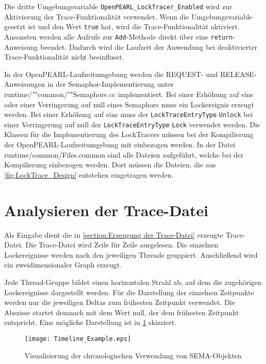 Die dritte Umgebungsvariable \texttt{OpenPEARL\_LockTracer\_Enabled} wird zur
Aktivierung der Trace-Funktionalität verwendet. Wenn die Umgebungsvariable
gesetzt ist und den Wert \texttt{true} hat, wird die Trace-Funktionalität
aktiviert. Ansonsten werden alle Aufrufe zur \texttt{Add}-Methode direkt über
eine \texttt{return}-Anweisung beendet. Dadurch wird die Laufzeit der Anwendung
bei deaktivierter Trace-Funktionalität nicht beeinflusst.

In der OpenPEARL-Laufzeitumgebung werden die \textrm{REQUEST}- und
\textrm{RELEASE}-Anweisungen in der Semaphor-Implementierung unter
runtime/""common/""Semaphore.cc implementiert. Bei einer Erhöhung auf eins oder
einer Verringerung auf null eines Semaphors muss ein Lockereignis erzeugt
werden. Bei einer Erhöhung auf eins muss der \texttt{Lock\-Trace\-Entry\-Type}
\texttt{Unlock} bei einer Verringerung auf null der
\texttt{Lock\-Trace\-Entry\-Type} \texttt{Lock} verwendet werden. Die Klassen
für die Implementierung des LockTracers müssen bei der Kompilierung der
OpenPEARL-Laufzeitumgebung mit einbezogen werden. In der Datei
runtime/common/Files.common sind alle Dateien aufgeführt, welche bei der
Kompilierung einbezogen werden. Dort müssen die Dateien, die aus
\cref{fig:LockTrace_Design} entstehen eingetragen werden.

\section{Analysieren der Trace-Datei}
\label{section:Analysieren der Trace-Datei}
Als Eingabe dient die in \cref{section:Erzeugung der Trace-Datei} erzeugte
Trace-Datei. Die Trace-Datei wird Zeile für Zeile ausgelesen. Die einzelnen
Lockereignisse werden nach den jeweiligen Threads gruppiert. Anschließend wird
ein zweidimensionaler Graph erzeugt.

Jede Thread-Gruppe bildet einen horizontalen Strahl ab, auf dem die zugehörigen
Lockereignisse dargestellt werden. Für die Darstellung der einzelnen Zeitpunkte
werden nur die jeweiligen Deltas zum frühesten Zeitpunkt verwendet. Die Abszisse
startet demnach mit dem Wert null, der dem frühesten Zeitpunkt entspricht. Eine
mögliche Darstellung ist in \cref{fig:Timeline_Example} skizziert.
\begin{figure}[ht]
  \texttt{[image: Timeline\_Example.eps]}
  \caption{Visualisierung der chronologischen Verwendung von \textrm{SEMA}-Objekten}
  \label{fig:Timeline_Example}
\end{figure}


